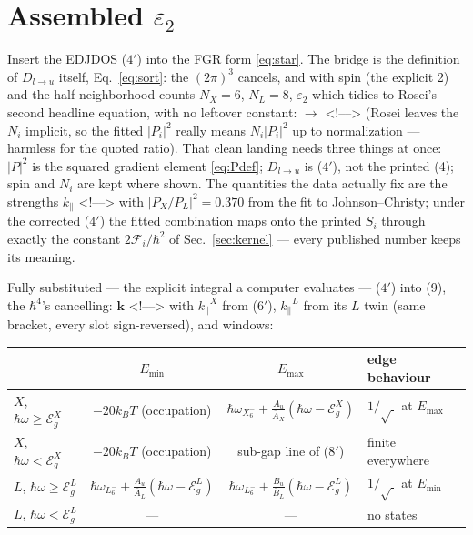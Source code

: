 \documentclass[11pt,a4paper]{article}
\numberwithin{equation}{section}
\begin{document}
\section{Assembled ${\varepsilon}_2$}
\label{sec:eps2}

Insert the EDJDOS ($4'$) into the FGR form \eqref{eq:star}.  The
bridge is the definition of ${D_{l\to u}}$ itself, Eq.~\eqref{eq:sort}: the
$(2\pi)^3$ cancels, and with spin (the explicit 2) and the
half-neighborhood counts $N_X=6$, $N_L=8$,
${\varepsilon}_2$
which tidies to Rosei's second headline equation, with no leftover
constant:
$\to$
<!--\label{eq:eps9}-->
(Rosei leaves the $N_i$ implicit, so the fitted $|P_i|^2$ really means
$N_i|P_i|^2$ up to normalization --- harmless for the quoted ratio).
That clean landing needs three things at once: $|P|^2$ is the squared
gradient element \eqref{eq:Pdef}; ${D_{l\to u}}$ is ($4'$), not the printed
(4); spin and $N_i$ are kept where shown.  The quantities the data
actually fix are the strengths
${k_{\parallel}}$
<!--\label{eq:S10}-->
with $|P_X/P_L|^2=0.370$ from the fit to Johnson--Christy; under the
corrected ($4'$) the fitted combination maps onto the printed $S_i$
through exactly the constant $2{\mathcal{F}}_i/\hbar^2$ of
Sec.~\ref{sec:kernel} --- every published number keeps its meaning.

Fully substituted --- the explicit integral a computer evaluates ---
($4'$) into (9), the $\hbar^4$'s cancelling:
$\mathbf{k}$
<!--\label{eq:eps11}-->
with ${k_{\parallel}}^{X}$ from ($6'$), ${k_{\parallel}}^{L}$ from its $L$ twin (same
bracket, every slot sign-reversed), and windows:

\begin{center}
\small
\begin{tabular}{lccl}
\toprule
 & $E_{\min}$ & $E_{\max}$ & edge behaviour \\
\midrule
$X$, ${\hbar\omega}\ge{\mathcal{E}_g^{X}}$ & $-20{k_B} T$ (occupation) & ${\hbar\omega_{X_6^-}}+\frac{A_u}{{\bar{A}}_X}({\hbar\omega}-{\mathcal{E}_g^{X}})$ & $1/\sqrt{\;}$ at $E_{\max}$ \\
$X$, ${\hbar\omega}<{\mathcal{E}_g^{X}}$ & $-20{k_B} T$ (occupation) & sub-gap line of ($8'$) & finite everywhere \\
$L$, ${\hbar\omega}\ge{\mathcal{E}_g^{L}}$ & ${\hbar\omega_{L_6^-}}+\frac{A_u}{{\bar{A}}_L}({\hbar\omega}-{\mathcal{E}_g^{L}})$ & ${\hbar\omega_{L_6^-}}+\frac{B_u}{{\bar{B}}_L}({\hbar\omega}-{\mathcal{E}_g^{L}})$ & $1/\sqrt{\;}$ at $E_{\min}$ \\
$L$, ${\hbar\omega}<{\mathcal{E}_g^{L}}$ & --- & --- & no states \\
\bottomrule
\end{tabular}\end{center}
\end{document}
